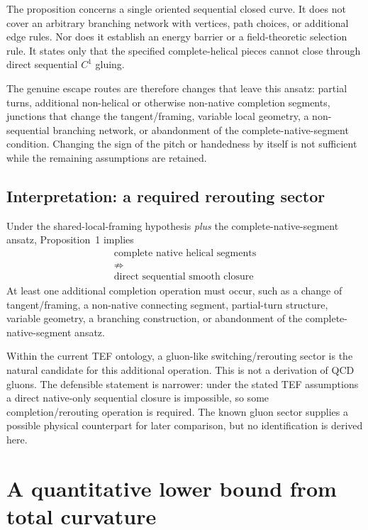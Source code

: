 \documentclass[10pt]{article}
\begin{document}
The proposition concerns a single oriented sequential closed curve. It does not cover an arbitrary branching network with vertices, path choices, or additional edge rules. Nor does it establish an energy barrier or a field-theoretic selection rule. It states only that the specified complete-helical pieces cannot close through direct sequential $C^1$ gluing.

The genuine escape routes are therefore changes that leave this ansatz: partial turns, additional non-helical or otherwise non-native completion segments, junctions that change the tangent/framing, variable local geometry, a non-sequential branching network, or abandonment of the complete-native-segment condition. Changing the sign of the pitch or handedness by itself is not sufficient while the remaining assumptions are retained.

\subsection{Interpretation: a required rerouting sector}

Under the shared-local-framing hypothesis \emph{plus} the complete-native-segment ansatz, Proposition~1 implies
\begin{equation}
\boxed{
\begin{gathered}
\text{complete native helical segments}\\
\not\Rightarrow\\
\text{direct sequential smooth closure}
\end{gathered}
}
\label{eq:reroutingRequired}
\end{equation}
At least one additional completion operation must occur, such as a change of tangent/framing, a non-native connecting segment, partial-turn structure, variable geometry, a branching construction, or abandonment of the complete-native-segment ansatz.

Within the current TEF ontology, a gluon-like switching/rerouting sector is the natural candidate for this additional operation. This is not a derivation of QCD gluons. The defensible statement is narrower: under the stated TEF assumptions a direct native-only sequential closure is impossible, so some completion/rerouting operation is required. The known gluon sector supplies a possible physical counterpart for later comparison, but no identification is derived here.

\section{A quantitative lower bound from total curvature}
\label{sec:curvature}
\end{document}

